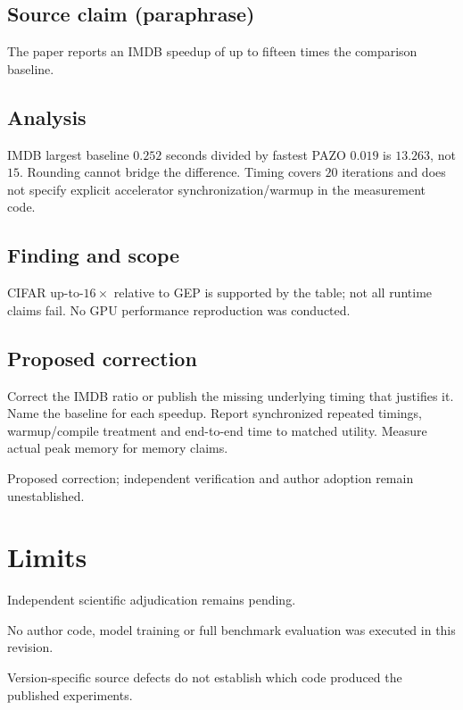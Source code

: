 \documentclass[11pt]{article}
\begin{document}
\subsection*{Source claim (paraphrase)}

The paper reports an IMDB speedup of up to fifteen times the comparison baseline.

\subsection*{Analysis}

IMDB largest baseline \(0.252\) seconds divided by fastest PAZO \(0.019\) is \(13.263\), not \(15\). Rounding cannot bridge the difference. Timing covers \(20\) iterations and does not specify explicit accelerator synchronization/warmup in the measurement code.

\subsection*{Finding and scope}

CIFAR up-to-\(16\times\) relative to GEP is supported by the table; not all runtime claims fail. No GPU performance reproduction was conducted.

\subsection*{Proposed correction}

Correct the IMDB ratio or publish the missing underlying timing that justifies it. Name the baseline for each speedup. Report synchronized repeated timings, warmup/compile treatment and end-to-end time to matched utility. Measure actual peak memory for memory claims.

Proposed correction; independent verification and author adoption remain unestablished.

\section*{Limits}

Independent scientific adjudication remains pending.\par

No author code, model training or full benchmark evaluation was executed in this revision.\par

Version-specific source defects do not establish which code produced the published experiments.\par
\end{document}
